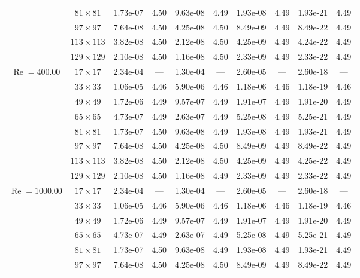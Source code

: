 \documentclass[preprint, 12pt]{elsarticle}
\begin{document}
{\begin{center}
\begin{table}[H]
{\begin{tabular*}{\textwidth}{@{\extracolsep\fill}cccccccccc@{}}
    & $81\times 81$ & 1.73e-07 & 4.50 & 9.63e-08 & 4.49 & 1.93e-08 & 4.49 & 1.93e-21 & 4.49 \\
    & $97\times 97$ & 7.64e-08 & 4.50 & 4.25e-08 & 4.50 & 8.49e-09 & 4.49 & 8.49e-22 & 4.49 \\
    & $113\times 113$ & 3.82e-08 & 4.50 & 2.12e-08 & 4.50 & 4.25e-09 & 4.49 & 4.24e-22 & 4.49 \\
    & $129\times 129$ & 2.10e-08 & 4.50 & 1.16e-08 & 4.50 & 2.33e-09 & 4.49 & 2.33e-22 & 4.49 \\
    \hline
    \multirow{7}{*}{$\operatorname{Re}=400.00$} & $17\times 17$ & 2.34e-04 & --- & 1.30e-04 & --- & 2.60e-05 & --- & 2.60e-18 & --- \\
    & $33\times 33$ & 1.06e-05 & 4.46 & 5.90e-06 & 4.46 & 1.18e-06 & 4.46 & 1.18e-19 & 4.46 \\
    & $49\times 49$ & 1.72e-06 & 4.49 & 9.57e-07 & 4.49 & 1.91e-07 & 4.49 & 1.91e-20 & 4.49 \\
    \multirow{3}{*}{$\operatorname{Wi}=5$} & $65\times 65$ & 4.73e-07 & 4.49 & 2.63e-07 & 4.49 & 5.25e-08 & 4.49 & 5.25e-21 & 4.49 \\
    & $81\times 81$ & 1.73e-07 & 4.50 & 9.63e-08 & 4.49 & 1.93e-08 & 4.49 & 1.93e-21 & 4.49 \\
    & $97\times 97$ & 7.64e-08 & 4.50 & 4.25e-08 & 4.50 & 8.49e-09 & 4.49 & 8.49e-22 & 4.49 \\
    & $113\times 113$ & 3.82e-08 & 4.50 & 2.12e-08 & 4.50 & 4.25e-09 & 4.49 & 4.25e-22 & 4.49 \\
    & $129\times 129$ & 2.10e-08 & 4.50 & 1.16e-08 & 4.49 & 2.33e-09 & 4.49 & 2.33e-22 & 4.49 \\
    \hline
    \multirow{7}{*}{$\operatorname{Re}=1000.00$} & $17\times 17$ & 2.34e-04 & --- & 1.30e-04 & --- & 2.60e-05 & --- & 2.60e-18 & --- \\
    & $33\times 33$ & 1.06e-05 & 4.46 & 5.90e-06 & 4.46 & 1.18e-06 & 4.46 & 1.18e-19 & 4.46 \\
    & $49\times 49$ & 1.72e-06 & 4.49 & 9.57e-07 & 4.49 & 1.91e-07 & 4.49 & 1.91e-20 & 4.49 \\
    \multirow{3}{*}{$\operatorname{Wi}=5$} & $65\times 65$ & 4.73e-07 & 4.49 & 2.63e-07 & 4.49 & 5.25e-08 & 4.49 & 5.25e-21 & 4.49 \\
    & $81\times 81$ & 1.73e-07 & 4.50 & 9.63e-08 & 4.49 & 1.93e-08 & 4.49 & 1.93e-21 & 4.49 \\
    & $97\times 97$ & 7.64e-08 & 4.50 & 4.25e-08 & 4.50 & 8.49e-09 & 4.49 & 8.49e-22 & 4.49 \\

\end{tabular*}}
\end{table}
\end{center}}
\end{document}
